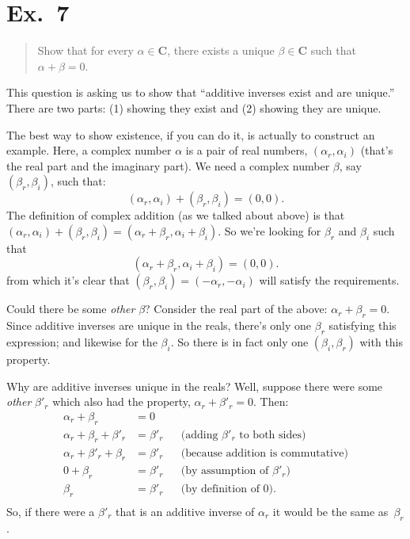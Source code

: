 \documentclass[10pt, a4paper, twocolumn]{article}
\newcommand{\set}[1]{\mathbold{#1}}
\begin{document}
\section*{Ex.~7}
\begin{quote}
  Show that for every $\alpha\in \set{C}$, there exists a unique $\beta\in \set{C}$
  such that $\alpha+\beta = 0$.
\end{quote}
This question is asking us to show that “additive inverses exist and are unique.” There are two parts: (1) showing they exist and (2) showing they are unique. 

The best way to show existence, if you can do it, is actually to construct an example. Here, a complex number $\alpha$ is a pair of real numbers, $(\alpha_r, \alpha_i)$ (that's the real part and the imaginary part). We need a complex number $\beta$, say $(\beta_r, \beta_i)$, such that:
\begin{equation*}
(\alpha_r, \alpha_i) + (\beta_r, \beta_i) = (0, 0).
\end{equation*}
The definition of complex addition (as we talked about above) is that $(\alpha_r, \alpha_i) + (\beta_r, \beta_i) = (\alpha_r + \beta_r, \alpha_i + \beta_i)$. So we're looking for $\beta_r$ and $\beta_i$ such that
\begin{equation*}
 (\alpha_r + \beta_r, \alpha_i + \beta_i)= (0, 0).
\end{equation*}
from which it's clear that $(\beta_r, \beta_i) = (-\alpha_r, -\alpha_i)$ will satisfy the
requirements.

Could there be some \emph{other} $\beta$? Consider the real part of the above: $\alpha_r + \beta_r = 0$. Since additive inverses are unique in the reals, there's only one $\beta_r$ satisfying this expression; and likewise for the $\beta_i$. So there is in fact only one $(\beta_i, \beta_r)$ with this property.

Why are additive inverses unique in the reals? Well, suppose there were some \emph{other} $\beta'_r$ which also had the property, $\alpha_r + \beta'_r =0$. Then:
\begin{equation*}
  \begin{aligned}
    \alpha_r + \beta_r &= 0 \\
    \alpha_r + \beta_r + \beta'_r &= \beta'_r &&\text{(adding $\beta'_r$ to both sides)} \\
    \alpha_r + \beta'_r + \beta_r &= \beta'_r &&\text{(because addition is commutative)} \\
      0 + \beta_r &= \beta'_r &&\text{(by assumption of $\beta'_r$)} \\
      \beta_r &= \beta'_r &&\text{(by definition of 0)}. \\
  \end{aligned}
\end{equation*}
So, if there were a $\beta'_r$ that is an additive inverse of $\alpha_r$ it would be the same as~$\beta_r$.
\end{document}
